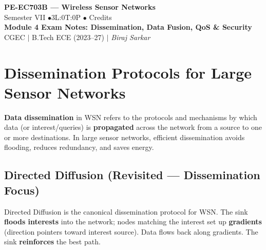 \documentclass[12pt,a4paper]{article}
\begin{document}

\begin{center}
  {\LARGE\bfseries\color{myred} PE-EC703B --- Wireless Sensor Networks}\\[5pt]
  {\normalsize\color{mydark} Semester VII \quad$\bullet$\quad 3L:0T:0P \quad$\bullet$ Credits}\\[3pt]
  {\normalsize\color{myteal}\textbf{Module 4 Exam Notes: Dissemination, Data Fusion, QoS \& Security}}\\[3pt]
  {\small\color{mydark} CGEC \;$|$\; B.Tech ECE (2023--27) \;$|$\; \textit{Biraj Sarkar}}
\end{center}
\vspace{2pt}
\noindent{\color{myred}\rule{\linewidth}{1.5pt}}
\vspace{2pt}

\hypersetup{linkcolor=mydark}
\tableofcontents
\hypersetup{linkcolor=myteal}
\newpage

\section{Dissemination Protocols for Large Sensor Networks}

\begin{tcolorbox}[defbox, title={\textbf{Data Dissemination --- Definition}}]
\textbf{Data dissemination} in WSN refers to the protocols and mechanisms by which data (or interest/queries) is \textbf{propagated} across the network from a source to one or more destinations. In large sensor networks, efficient dissemination avoids flooding, reduces redundancy, and saves energy.
\end{tcolorbox}

\subsection{Directed Diffusion (Revisited --- Dissemination Focus)}

Directed Diffusion is the canonical dissemination protocol for WSN. The sink \textbf{floods interests} into the network; nodes matching the interest set up \textbf{gradients} (direction pointers toward interest source). Data flows back along gradients. The sink \textbf{reinforces} the best path.
\end{document}
